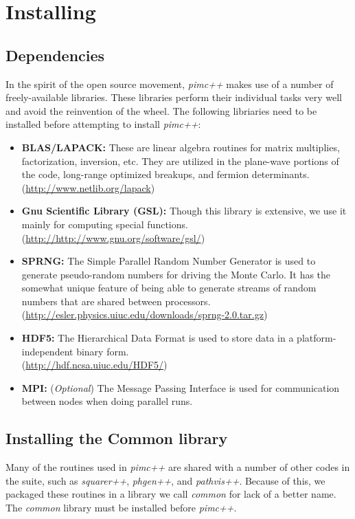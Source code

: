 \documentclass{book}
\begin{document}
\chapter{Installing}
\section{Dependencies}
In the spirit of the open source movement, {\em pimc++} makes use of a
number of freely-available libraries.  These libraries perform their
individual tasks very well and avoid the reinvention of the wheel.
The following libriaries need to be installed before attempting to
install {\em pimc++}:
\begin{itemize}
  \item {\bf BLAS/LAPACK:}  These are linear algebra routines for
    matrix multiplies, factorization, inversion, etc.  They are utilized
    in the plane-wave portions of the code, long-range optimized
    breakups, and fermion determinants.  \\
    (\href{http://www.netlib.org/lapack}{http://www.netlib.org/lapack})
  \item {\bf Gnu Scientific Library (GSL):}  Though this library is
    extensive, we use it mainly for computing special functions.\\
    (\href{http://http://www.gnu.org/software/gsl/}{http://http://www.gnu.org/software/gsl/})
  \item {\bf SPRNG:}  The Simple Parallel Random Number Generator is
    used to generate pseudo-random numbers for driving the Monte Carlo.
    It has the somewhat unique feature of being able to generate streams
    of random numbers that are shared between processors.\\
   (\href{http://esler.physics.uiuc.edu/downloads/sprng-2.0.tar.gz}{http://esler.physics.uiuc.edu/downloads/sprng-2.0.tar.gz})
  \item {\bf HDF5:}  The Hierarchical Data Format is used to store
    data in a platform-independent binary form.  \\
    (\href{http://hdf.ncsa.uiuc.edu/HDF5/}{http://hdf.ncsa.uiuc.edu/HDF5/})
  \item {\bf MPI:} ({\em Optional})  The Message Passing Interface is
    used for communication between nodes when doing parallel runs.
\end{itemize}

\section{Installing the Common library}
Many of the routines used in {\em pimc++} are shared with a number of
other codes in the suite, such as {\em squarer++}, {\em phgen++}, and
{\em pathvis++}.  Because of this, we packaged these routines in a
library we call {\em common} for lack of a better name.  The {\em common}
library must be installed before {\em pimc++}.  
\end{document}
